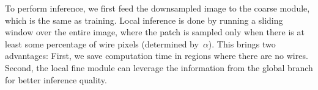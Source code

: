 
To perform inference, we first feed the downsampled image to the coarse module, which is the same as training. 
Local inference is done by running a sliding window over the entire image, where the patch is sampled only when there is at least some percentage of wire pixels (determined by~$\alpha$). This brings two advantages: First, we save computation time in regions where there are no wires. Second, the local fine module can leverage the information from the global branch for better inference quality.


